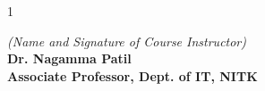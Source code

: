 \begin{spacing}{1}
{{\vspace{40.9pt}
\hspace*{10.18cm}\begin{minipage}[t]{7.6cm}
\textit{(Name and Signature of Course Instructor)}\\
\hspace*{0.07cm}\textbf{Dr. Nagamma Patil}\\
\hspace*{0.07cm}\textbf{Associate Professor, Dept. of IT, NITK}
\end{minipage}\par}
}
\end{spacing}
\clearpage
\restoregeometry
